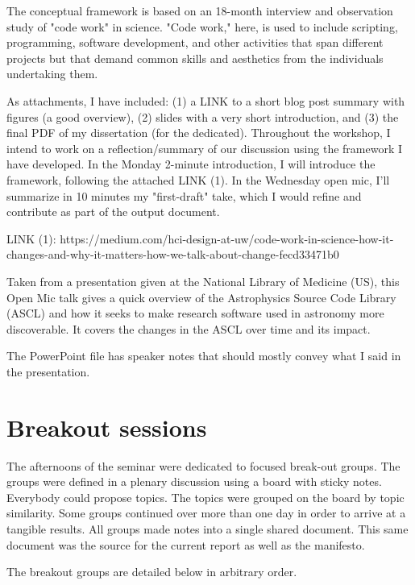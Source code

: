 \documentclass[a4paper,UKenglish]{dagrep}
\begin{document}
The conceptual framework is based on an 18-month interview and observation study of "code work" in science. "Code work," here, is used to include scripting, programming, software development, and other activities that span different projects but that demand common skills and aesthetics from the individuals undertaking them.

As attachments, I have included: (1) a LINK to a short blog post summary with figures (a good overview), (2) slides with a very short introduction, and (3) the final PDF of my dissertation (for the dedicated). Throughout the workshop, I intend to work on a reflection/summary of our discussion using the framework I have developed. In the Monday 2-minute introduction, I will introduce the framework, following the attached LINK (1). In the Wednesday open mic, I'll summarize in 10 minutes my "first-draft" take, which I would refine and contribute as part of the output document.

LINK (1): https://medium.com/hci-design-at-uw/code-work-in-science-how-it-changes-and-why-it-matters-how-we-talk-about-change-fecd33471b0


Taken from a presentation given at the National Library of Medicine (US), this Open Mic talk gives a quick overview of the Astrophysics Source Code Library (ASCL) and how it seeks to make research software used in astronomy more discoverable. It covers the changes in the ASCL over time and its impact.

The PowerPoint file has speaker notes that should mostly convey what I said in the presentation.

\section{Breakout sessions}

The afternoons of the seminar were dedicated to focused break-out groups. The groups were defined in a plenary discussion using a board with sticky notes. Everybody could propose topics. The topics were grouped on the board by topic similarity. Some groups continued over more than one day in order to arrive at a tangible results. All groups made notes into a single shared document. This same document was the source for the current report as well as the manifesto.

The breakout groups are detailed below in arbitrary order.
\end{document}
